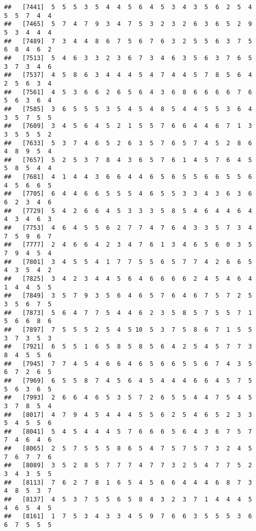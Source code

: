 \documentclass[
]{book}
\begin{document}
\begin{verbatim}
##   [7441]  5  5  5  3  5  4  4  5  6  4  5  3  4  3  5  6  2  5  4  5  5  7  4  4
##   [7465]  5  7  4  7  9  3  4  7  5  3  2  3  2  6  3  6  5  2  9  5  3  4  4  4
##   [7489]  7  3  4  4  8  6  7  5  6  7  6  3  2  5  5  6  3  7  5  6  8  4  6  2
##   [7513]  5  4  6  3  3  2  3  6  7  3  4  6  3  5  6  3  7  6  5  3  7  3  4  6
##   [7537]  4  5  8  6  3  4  4  4  5  4  7  4  4  5  7  8  5  6  4  2  5  6  3  4
##   [7561]  4  5  3  6  6  2  6  5  6  4  3  6  8  6  6  6  6  7  6  5  6  3  6  4
##   [7585]  3  6  5  5  5  3  5  4  5  4  8  5  4  4  5  5  3  6  4  3  5  7  5  5
##   [7609]  3  4  5  6  4  5  2  1  5  5  7  6  6  4  4  6  7  1  3  3  5  5  5  2
##   [7633]  5  3  7  4  6  5  2  6  3  5  7  6  5  7  4  5  2  8  6  4  8  9  5  4
##   [7657]  5  2  5  3  7  8  4  3  6  5  7  6  1  4  5  7  6  4  5  5  8  5  4  4
##   [7681]  4  1  4  4  3  6  6  4  4  6  5  6  5  5  6  6  5  5  6  4  5  6  6  5
##   [7705]  6  4  4  6  6  5  5  5  4  6  5  5  3  3  4  3  6  3  6  6  2  3  4  6
##   [7729]  5  4  2  6  6  4  5  3  3  3  5  8  5  4  6  4  4  6  4  4  3  4  6  3
##   [7753]  4  6  4  5  5  6  2  7  7  4  7  6  4  3  3  5  7  3  4  7  5  9  6  7
##   [7777]  2  4  6  6  4  2  3  4  7  6  1  3  4  6  5  6  0  3  5  7  9  4  5  4
##   [7801]  3  4  5  5  4  1  7  7  5  5  6  5  7  7  4  2  6  6  5  4  3  5  4  2
##   [7825]  3  4  2  3  4  4  5  6  4  6  6  6  6  2  4  5  4  6  4  1  4  4  5  5
##   [7849]  3  5  7  9  3  5  6  4  6  5  7  6  4  6  7  5  7  2  5  3  5  6  7  5
##   [7873]  5  6  4  7  7  5  4  4  6  2  3  5  8  5  7  5  5  7  1  5  6  6  8  6
##   [7897]  7  5  5  5  2  5  4  5 10  5  3  7  5  8  6  7  1  5  5  3  7  3  5  3
##   [7921]  6  5  5  1  6  5  8  5  8  5  6  4  2  5  4  5  7  7  3  8  4  5  5  6
##   [7945]  7  7  4  5  4  6  6  4  6  5  6  6  5  5  6  7  4  3  5  6  7  2  6  5
##   [7969]  6  5  5  8  7  4  5  6  4  5  4  4  4  6  6  4  5  7  5  5  6  3  6  5
##   [7993]  2  6  6  4  6  5  3  5  7  2  6  5  5  4  4  7  5  4  5  3  7  8  5  4
##   [8017]  4  7  9  4  5  4  4  4  5  5  6  2  5  4  6  5  2  3  3  5  4  5  5  6
##   [8041]  5  4  5  4  4  4  5  7  6  6  6  5  6  4  3  6  7  5  7  7  4  6  4  6
##   [8065]  2  5  7  5  5  5  8  6  5  4  7  5  7  5  7  3  2  4  5  7  6  7  7  6
##   [8089]  3  5  2  8  5  7  7  7  4  7  7  3  2  5  4  7  7  5  2  3  4  3  5  5
##   [8113]  7  6  2  7  8  1  6  5  4  5  6  6  4  4  4  6  8  7  3  4  8  5  3  7
##   [8137]  4  5  3  7  5  5  6  5  8  4  3  2  3  7  1  4  4  4  5  4  6  5  4  5
##   [8161]  1  7  5  3  4  3  3  4  5  9  7  6  6  3  5  5  5  3  6  6  7  5  5  5

\end{verbatim}
\end{document}
